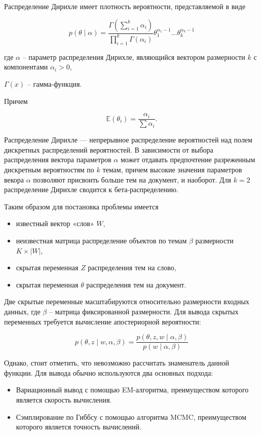 \documentclass[12pt,a4paper, oneside]{extreport}
\begin{document}
Распределение Дирихле имеет плотность вероятности, представляемой в виде 

$$
p(\theta \mid \alpha)=\frac{\Gamma\left(\sum_{i=1}^{k} \alpha_{i}\right)}{\prod_{i=1}^{k} \Gamma\left(\alpha_{i}\right)} \theta_{1}^{\alpha_{1}-1} \ldots \theta_{k}^{\alpha_{k}-1}
$$


где $\alpha$ -- параметр распределения Дирихле, являющийся  вектором размерности $k$ с компонентами $\alpha_{i}>0$,

$\Gamma(x)$  -- гамма-функция. 

Причем

$$
\mathbb{E}\left(\theta_{i}\right)=\frac{\alpha_{i}}{\sum \alpha_{i}}
.
$$

Распределение Дирихле — непрерывное распределение вероятностей  над полем  дискретных  распределений вероятностей. 
В зависимости от выбора распределения вектора параметров  $\alpha$    может отдавать предпочтение разреженным дискретным вероятностям по  $k$  темам, причем высокие значения параметров векора $\alpha$  позволяют присвоить  больше тем на документ, и наоборот. 
Для $k = 2$  распределение  Дирихле сводится  к бета-распределению. 


Таким образом для постановка проблемы имеется 
\begin{itemize}
	\item известный вектор  «слов» $W$,
	\item неизвестная матрица распределение объектов  по темам   $\beta$  размерности $K \times|W|$,
	\item скрытая переменная $Z $ распределения тем на слово,
	\item скрытая переменная $\theta$ распределения тем на документ.
\end{itemize}  

Две скрытые переменные масштабируются относительно  размерности  входных данных, где $\beta$  -- матрица фиксированной размерности. Для вывода скрытых переменных требуется вычисление апостериорной вероятности: 

$$
p(\theta, z \mid w, \alpha, \beta)=\frac{p(\theta, z, w \mid \alpha, \beta)}{p(w \mid \alpha, \beta)}
$$

Однако, стоит отметить, что невозможно рассчитать  знаменатель данной функции. Для вывода обычно используются два основных подхода:

\begin{itemize}
	\item Вариационный вывод с помощью EM-алгоритма, преимуществом которого является скорость вычисления.
	\item Сэмплирование по Гиббсу с помощью алгоритма MCMC, преимуществом которого является точность  вычислений.	
\end{itemize}
\end{document}
